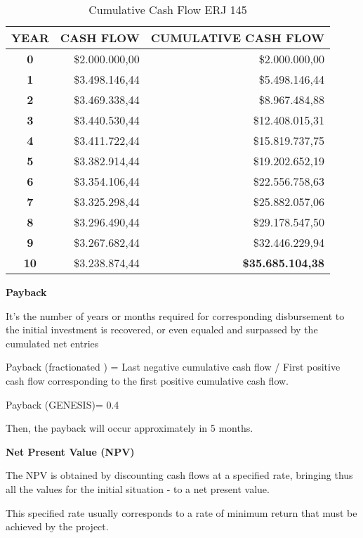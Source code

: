 \begin{table}[htbp]
  \scriptsize
  \centering
  \caption{Cumulative Cash Flow ERJ 145}
    \begin{tabular}{crr}
    \toprule
    \textbf{YEAR} & \multicolumn{1}{c}{\textbf{CASH FLOW}} & \multicolumn{1}{c}{\textbf{CUMULATIVE CASH FLOW}} \\
    \midrule
    \textbf{0} & \$2.000.000,00 & \$2.000.000,00 \\
    \textbf{1} & \$3.498.146,44 & \$5.498.146,44 \\
    \textbf{2} & \$3.469.338,44 & \$8.967.484,88 \\
    \textbf{3} & \$3.440.530,44 & \$12.408.015,31 \\
    \textbf{4} & \$3.411.722,44 & \$15.819.737,75 \\
    \textbf{5} & \$3.382.914,44 & \$19.202.652,19 \\
    \textbf{6} & \$3.354.106,44 & \$22.556.758,63 \\
    \textbf{7} & \$3.325.298,44 & \$25.882.057,06 \\
    \textbf{8} & \$3.296.490,44 & \$29.178.547,50 \\
    \textbf{9} & \$3.267.682,44 & \$32.446.229,94 \\
    \textbf{10} & \$3.238.874,44 & \textbf{\$35.685.104,38} \\
    \bottomrule
    \end{tabular}%
  \label{tab:CumulCash2}%
\end{table}%

\textbf{Payback}

It's the number of years or months required for corresponding disbursement to the initial investment is recovered, or even equaled and surpassed by the cumulated net entries

Payback (fractionated ) = Last negative cumulative cash flow / First positive cash flow corresponding to the first positive cumulative cash flow.

Payback (GENESIS)= 0.4

Then, the payback will occur approximately in 5 months.

\textbf{Net Present Value (NPV)}

The NPV is obtained by discounting cash flows at a specified rate, bringing thus all the values for the initial situation - to a net present value.

This specified rate usually corresponds to a rate of minimum return that must be achieved by the project.

